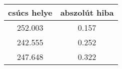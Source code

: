 \begin{center}
\begin{tabular}{|c|c|}
\hline
csúcs helye & abszolút hiba \\
\hline
252.003 & 0.157 \\
\hline
242.555 & 0.252 \\
\hline
247.648 & 0.322 \\
\hline
\end{tabular}
\end{center}